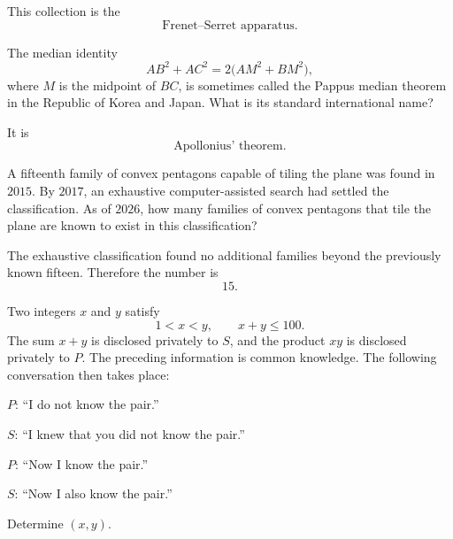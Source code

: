     \begin{solution}
        This collection is the
        \[
            \boxed{\text{Frenet--Serret apparatus}}.
        \]
    \end{solution}

    \begin{expectedproblem}
        The median identity
        \[
            AB^2+AC^2
            =
            2\bigl(AM^2+BM^2\bigr),
        \]
        where $M$ is the midpoint of $BC$, is sometimes called the Pappus
        median theorem in the Republic of Korea and Japan. What is its standard international
        name?
    \end{expectedproblem}

    \begin{solution}
        It is
        \[
            \boxed{\text{Apollonius' theorem}}.
        \]
    \end{solution}

    \begin{expectedproblem}
        A fifteenth family of convex pentagons capable of tiling the plane was
        found in $2015$. By $2017$, an exhaustive computer-assisted search had
        settled the classification. As of $2026$, how many families of convex
        pentagons that tile the plane are known to exist in this classification?
    \end{expectedproblem}

    \begin{solution}
        The exhaustive classification found no additional families beyond the
        previously known fifteen. Therefore the number is
        \[
            \boxed{15}.
        \]
    \end{solution}


    \begin{expectedproblem}
        Two integers $x$ and $y$ satisfy
        \[
            1<x<y,
            \qquad
            x+y\leq100.
        \]
        The sum $x+y$ is disclosed privately to $S$, and the product $xy$ is
        disclosed privately to $P$. The preceding information is common
        knowledge. The following conversation then takes place:
        \begin{problemchoices}
            \item $P$: ``I do not know the pair.''
            \item $S$: ``I knew that you did not know the pair.''
            \item $P$: ``Now I know the pair.''
            \item $S$: ``Now I also know the pair.''
        \end{problemchoices}
        Determine $(x,y)$.
    \end{expectedproblem}

